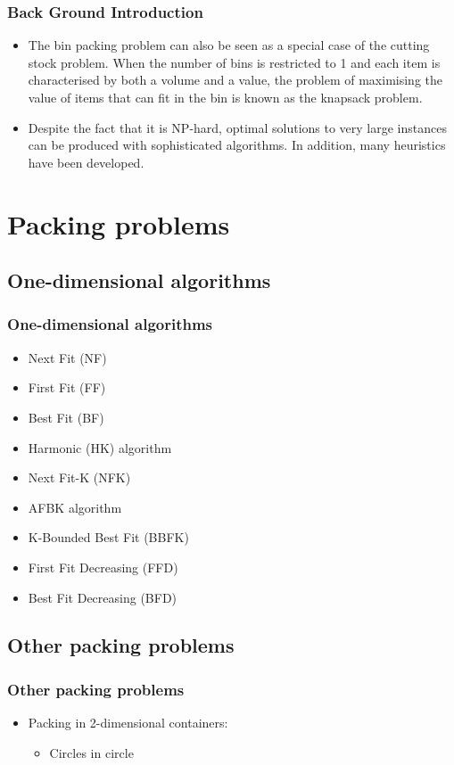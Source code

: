 \documentclass[slidestop,compress,mathserif,brown]{beamer}
\begin{document}
\begin{CJK}{UTF8}{kai}
\begin{frame}
\frametitle{Back Ground Introduction}
\begin{itemize}
	\item The bin packing problem can also be seen as a special case of the {\color{red}cutting stock problem}. When the number of bins is restricted to 1 and each item is characterised by both a volume and a value, the problem of maximising the value of items that can fit in the bin is known as the knapsack problem.
	\item Despite the fact that it is NP-hard, optimal solutions to very large instances can be produced with sophisticated algorithms. In addition, many heuristics have been developed.
\end{itemize}
\end{frame}

\section{Packing problems}
\subsection{One-dimensional algorithms}
\begin{frame}
\frametitle{One-dimensional algorithms}
	\begin{itemize}
		\item Next Fit (NF) 
		\item First Fit (FF)
		\item Best Fit (BF) 
		\item Harmonic (HK) algorithm
		\item Next Fit-K (NFK)  
		\item	AFBK algorithm
		\item K-Bounded Best Fit (BBFK)  
		\item First Fit Decreasing (FFD)  
		\item Best Fit Decreasing (BFD)
	\end{itemize}
\end{frame}


\subsection{Other packing problems}
\begin{frame}
\frametitle{Other packing problems}
\begin{itemize}
	\item Packing in 2-dimensional containers:
	\begin{itemize}
		\item Circles in circle


\end{itemize}
\end{itemize}
\end{frame}
\end{CJK}
\end{document}
